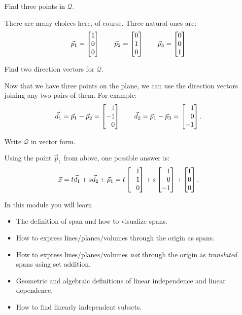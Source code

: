 \documentclass{problemset}
\begin{document}
	\begin{parts}
		\item Find three points in $\mathcal Q$.
			\begin{solution}
				There are many choices here, of course. Three natural ones are:
				\[
					\vec p_1 = \mat{1\\0\\0}
					\qquad
					\vec p_2 = \mat{0\\1\\0}
					\qquad
					\vec p_3 = \mat{0\\0\\1}
				\]
			\end{solution}
		\item Find two direction vectors for $\mathcal Q$.
			\begin{solution}
				Now that we have three points on the plane, we can use the
				direction vectors joining any two pairs of them. For example:
				\[
					\vec d_1 = \vec p_1 - \vec p_2 = \mat{1\\-1\\0}
					\qquad
					\vec d_2 = \vec p_1 - \vec p_3 = \mat{1\\0\\-1}.
				\]
			\end{solution}
		\item Write $\mathcal Q$ in vector form.
			\begin{solution}
				Using the point $\vec p_1$ from above, one possible answer is:
				\[
					\vec x = t\vec d_1 + s\vec d_2 + \vec p_1
					= t \mat{1\\-1\\0} + s \mat{1\\0\\-1} + \mat{1\\0\\0}.
				\]
			\end{solution}
	\end{parts}

\begin{module}

	In this module you will learn
	\begin{itemize}
		\item The definition of span and how to visualize spans.
		\item How to express lines/planes/volumes through the origin as spans.
		\item How to express lines/planes/volumes \emph{not} through the origin as
			\emph{translated} spans using set addition.
		\item Geometric and algebraic definitions of linear independence and linear 
			dependence.
		\item How to find linearly independent subsets.
	\end{itemize}

	
\end{module}
\end{document}
